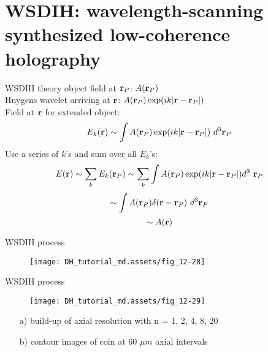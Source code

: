 \documentclass[t, aspectratio=169]{beamer}
\begin{document}
\section{WSDIH: wavelength-scanning synthesized low-coherence holography}
\begin{frame}[c]
	\centering\LARGE\textbf{\secname}
\end{frame}


\begin{frame}{WSDIH theory}
object field at $\textbf r_P$: $ A(\textbf r_P) $ \\
Huygens wavelet arriving at $\textbf r$: $ A(\textbf r_P)\exp(ik|\textbf r - \textbf r_P|) $ \\
Field at $\textbf r$ for extended object: 
\[ E_k(\textbf r) \sim \int A(\textbf r_P)\exp(ik|\textbf r - \textbf r_P|)\ d^3\textbf r_P \]
Use a series of $k$'s and sum over all $E_k$'s: 
\[ E(\textbf r) \sim \sum_k E_k(\textbf r_P) \sim \sum_k \int A(\textbf r_P)\exp(ik|\textbf r - \textbf r_P|)d^3\ \textbf r_P \]
\[ \sim \int A(\textbf r_P)\delta(\textbf r - \textbf r_P)\ d^3\textbf r_P \]
\[ \sim A(\textbf r) \]
\end{frame}


\begin{frame}{WSDIH process}
	\begin{figure}
		\texttt{[image: DH\_tutorial\_md.assets/fig\_12-28]}
	\end{figure}
\end{frame}


\begin{frame}{WSDIH process}
	\begin{figure}
		\texttt{[image: DH\_tutorial\_md.assets/fig\_12-29]}
	\end{figure}
	\begin{itemize}
 		\setlength{\itemindent}{15 mm}
		\item[a) ] build-up of axial resolution with n = 1, 2, 4, 8, 20
		\item[b) ] contour images of coin at 60 $\mu m$ axial intervals
	\end{itemize}
\end{frame}




\end{document}
